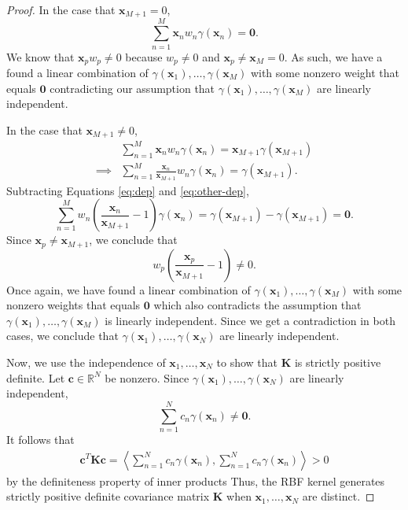 \begin{proof}
    In the case that $\mathbf{x}_{M + 1} = 0$,
    \begin{equation*}
        \sum\limits_{n=1}^{M} \mathbf{x}_n w_n \gamma(\mathbf{x}_n) = \mathbf{0}.
    \end{equation*}
    We know that $\mathbf{x}_p w_p \neq 0$ because $w_p \neq 0$ and $\mathbf{x}_p \neq \mathbf{x}_M = 0$.
    As such, we have a found a linear combination of $\gamma(\mathbf{x}_1), \dots, \gamma(\mathbf{x}_M)$ with some nonzero weight that equals $\mathbf{0}$ contradicting our assumption that $\gamma(\mathbf{x}_1), \dots, \gamma(\mathbf{x}_M)$ are linearly independent.

    In the case that $\mathbf{x}_{M + 1} \neq 0$,
    \begin{align}
        &\sum\limits_{n=1}^{M} \mathbf{x}_n w_n \gamma(\mathbf{x}_n) = {\mathbf{x}_{M + 1}}\gamma(\mathbf{x}_{M + 1}) \\
        \implies &\sum\limits_{n=1}^{M} \frac{\mathbf{x}_n}{\mathbf{x}_{M + 1}} w_n \gamma(\mathbf{x}_n) = \gamma(\mathbf{x}_{M + 1}). \label{eq:other-dep}
    \end{align}
    Subtracting Equations \ref{eq:dep} and \ref{eq:other-dep},
    \begin{equation*}
        \sum\limits_{n=1}^{M} w_n \left(\frac{\mathbf{x}_n}{\mathbf{x}_{M + 1}} - 1\right) \gamma(\mathbf{x}_n) = \gamma(\mathbf{x}_{M + 1}) - \gamma(\mathbf{x}_{M + 1}) = \mathbf{0}.
    \end{equation*}
    Since $\mathbf{x}_p \neq \mathbf{x}_{M + 1}$, we conclude that
    \begin{equation*}
        w_p\left(\frac{ \mathbf{x}_p }{ \mathbf{x}_{M + 1} } - 1\right) \neq 0.
    \end{equation*}
    Once again, we have found a linear combination of $\gamma(\mathbf{x}_1), \dots, \gamma(\mathbf{x}_M)$ with some nonzero weights that equals $\mathbf{0}$ which also contradicts the assumption that $\gamma(\mathbf{x}_1), \dots, \gamma(\mathbf{x}_M)$ is linearly independent.
    Since we get a contradiction in both cases, we conclude that $\gamma(\mathbf{x}_1), \dots, \gamma(\mathbf{x}_N)$ are linearly independent.

    Now, we use the independence of $\mathbf{x}_1, \dots, \mathbf{x}_N$ to show that $\mathbf{K}$ is strictly positive definite.
    Let $\mathbf{c} \in \mathbb{R}^{N}$ be nonzero.
    Since $\gamma(\mathbf{x}_1), \dots, \gamma(\mathbf{x}_N)$ are linearly independent,
    \begin{equation*}
        \sum\limits_{n = 1}^{N} c_n \gamma(\mathbf{x}_n) \neq \mathbf{0}.
    \end{equation*}
    It follows that
    \begin{align*}
        \mathbf{c}^{T} \mathbf{K} \mathbf{c}
        = \left\langle \sum\limits_{n = 1}^{N} c_n \gamma(\mathbf{x}_n), \sum\limits_{n = 1}^{N} c_n \gamma(\mathbf{x}_n) \right\rangle
        > 0
    \end{align*}
    by the definiteness property of inner products
    Thus, the RBF kernel generates strictly positive definite covariance matrix $\mathbf{K}$ when $\mathbf{x}_1, \dots, \mathbf{x}_N$
    are distinct.
\end{proof}
